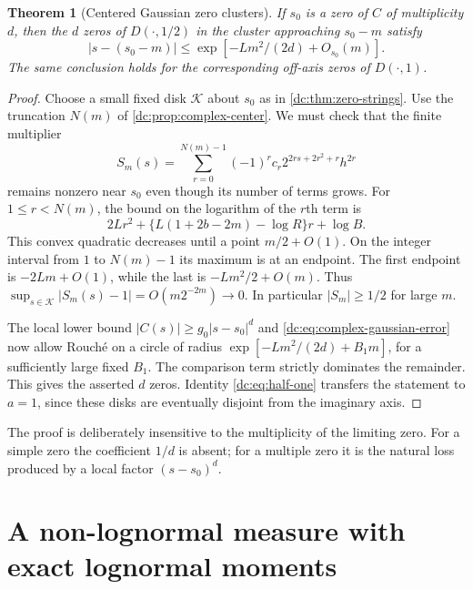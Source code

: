 \documentclass[11pt,a4paper,oneside,openany]{book}
\numberwithin{equation}{chapter}
\newtheorem{theorem}{Theorem}[chapter]
\theoremstyle{definition}
\theoremstyle{remark}
\newcommand{\abs}[1]{\left\lvert #1\right\rvert}
\begin{document}
\begin{theorem}[Centered Gaussian zero clusters]
\label{dc:thm:zero-gaussian}
If $s_0$ is a zero of $C$ of multiplicity $d$, then the $d$ zeros of
$D(\cdot,1/2)$ in the cluster approaching $s_0-m$ satisfy
\begin{equation}
 \abs{s-(s_0-m)}
 \le\exp[-Lm^2/(2d)+O_{s_0}(m)].
 \label{dc:eq:center-zero-bound}
\end{equation}
The same conclusion holds for the corresponding off-axis zeros of
$D(\cdot,1)$.
\end{theorem}
\begin{proof}
Choose a small fixed disk $\mathcal K$ about $s_0$ as in
\cref{dc:thm:zero-strings}. Use the truncation $N(m)$ of
\cref{dc:prop:complex-center}. We must check that the finite
multiplier
\[
 S_m(s)=\sum_{r=0}^{N(m)-1}(-1)^rc_r
        2^{2rs+2r^2+r}h^{2r}
\]
remains nonzero near $s_0$ even though its number of terms grows.
For $1\le r<N(m)$, the bound on the logarithm of the $r$th term is
\[
 2Lr^2+\{L(1+2b-2m)-\log R\}r+\log B.
\]
This convex quadratic decreases until a point $m/2+O(1)$.
On the integer interval from $1$ to $N(m)-1$ its maximum is at an
endpoint. The first endpoint is $-2Lm+O(1)$, while the last is
$-Lm^2/2+O(m)$. Thus
$\sup_{s\in\mathcal K}\abs{S_m(s)-1}=O(m2^{-2m})\to0$.
In particular $\abs{S_m}\ge1/2$ for large $m$.

The local lower bound $\abs{C(s)}\ge g_0\abs{s-s_0}^d$ and
\cref{dc:eq:complex-gaussian-error} now allow Rouch\'e on a circle of
radius $\exp[-Lm^2/(2d)+B_1m]$, for a sufficiently large fixed
$B_1$. The comparison term strictly dominates the remainder.
This gives the asserted $d$ zeros. Identity \cref{dc:eq:half-one}
transfers the statement to $a=1$, since these disks are eventually
disjoint from the imaginary axis.
\end{proof}

The proof is deliberately insensitive to the multiplicity of the
limiting zero. For a simple zero the coefficient $1/d$ is absent;
for a multiple zero it is the natural loss produced by a local
factor $(s-s_0)^d$.
\chapter{A non-lognormal measure with exact lognormal moments}
\label{dc:sec:moments}
\end{document}
